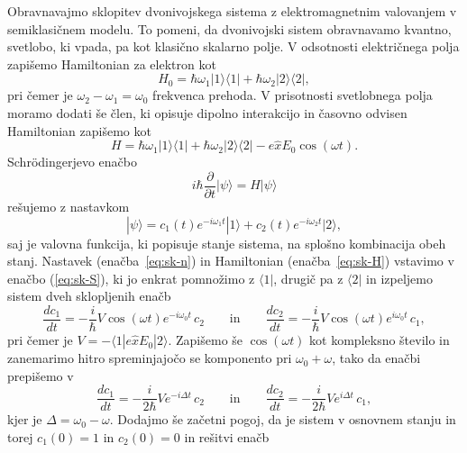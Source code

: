 Obravnavajmo sklopitev dvonivojskega sistema z elektromagnetnim valovanjem 
v semiklasičnem modelu. 
To pomeni, da dvonivojski sistem obravnavamo kvantno, 
svetlobo, ki vpada, pa kot klasično skalarno polje. 
V odsotnosti električnega polja zapišemo Hamiltonian za elektron kot
\begin{equation}
H_0 = \hbar \omega_1 |1\rangle \langle1| + \hbar \omega_2 |2\rangle \langle2|,
\end{equation}
pri čemer je $\omega_2- \omega_1 = \omega_0$ frekvenca prehoda. V prisotnosti 
svetlobnega polja moramo dodati še člen, ki opisuje dipolno interakcijo in 
časovno odvisen Hamiltonian zapišemo kot
\begin{equation}
H = \hbar \omega_1 |1\rangle \langle1| + \hbar \omega_2 |2\rangle \langle2|
-e\hat{x}E_0 \cos (\omega t).
\label{eq:sk-H}
\end{equation}
Schr\"odingerjevo enačbo
\begin{equation}
i \hbar \frac{\partial}{\partial t}|\psi\rangle = H|\psi\rangle
\label{eq:sk-S}
\end{equation}
rešujemo z nastavkom 
\begin{equation}
|\psi\rangle = c_1(t)e^{-i \omega_1t}|1\rangle + c_2(t)e^{-i \omega_2t}|2\rangle,
\label{eq:sk-n}
\end{equation}
saj je valovna funkcija, ki popisuje stanje sistema, na splošno
kombinacija obeh stanj. Nastavek (enačba~\ref{eq:sk-n}) in Hamiltonian 
(enačba~\ref{eq:sk-H}) vstavimo v enačbo (\ref{eq:sk-S}), ki jo enkrat pomnožimo 
z $\langle1|$, drugič pa z $\langle2|$ in izpeljemo sistem dveh sklopljenih enačb
\begin{equation}
\frac{d c_1}{dt}=-\frac{i}{\hbar} V \cos (\omega t) e^{-i\omega_0 t}\, c_2 
\qquad \mathrm{in} \qquad
\frac{d c_2}{dt}=-\frac{i}{\hbar} V \cos (\omega t) e^{i\omega_0 t}\, c_1,
\end{equation}
pri čemer je $V = -\langle1|e\hat{x}E_0|2\rangle$. Zapišemo še $\cos(\omega t)$ kot
kompleksno število in zanemarimo hitro spreminjajočo se komponento pri $\omega_0 + \omega$,
tako da enačbi prepišemo v 
\begin{equation}
\frac{d c_1}{dt}=-\frac{i}{2\hbar} V e^{-i\Delta t}\, c_2 
\qquad \mathrm{in} \qquad
\frac{d c_2}{dt}=-\frac{i}{2\hbar} V e^{i\Delta t}\, c_1,
\label{eq:rabi2}
\end{equation}
kjer je $\Delta = \omega_0-\omega$. Dodajmo še začetni pogoj, da je 
sistem v osnovnem stanju in torej $c_1(0)=1$ in $c_2(0)=0$ in rešitvi enačb

